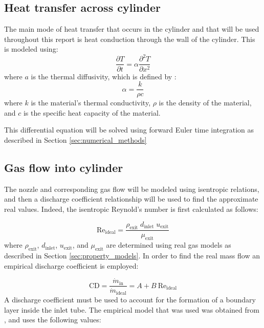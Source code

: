 





\subsection{Heat transfer across cylinder}

The main mode of heat transfer that occurs in the cylinder and that will be used throughout this report is heat conduction through the wall of the cylinder. This is modeled using:
\begin{equation}
\frac{\partial T}{\partial t} = \alpha \frac{\partial^2 T }{\partial x^2}
\end{equation}
where $a$ is the thermal diffusivity, which is defined by :
\begin{equation}
\alpha = \frac{k}{\rho c}
\end{equation}
where $k$ is the material's thermal conductivity, $\rho$ is the density of the material, and $c$ is the specific heat capacity of the material.

This differential equation will be solved using forward Euler time integration as described in Section \ref{sec:numerical_methods}

\subsection{Gas flow into cylinder}

The nozzle and corresponding gas flow will be modeled using isentropic relations, and then a discharge coefficient relationship will be used to find the approximate real values. Indeed, the isentropic Reynold's number is first calculated as follows:

\begin{equation}
\text{Re}_{\text{ideal}} = \frac{\rho_{\text{exit}}\;d_{\text{inlet}}\;u_{\text{exit}}}{\mu_{\text{exit}}}
\end{equation}
where $\rho_{\text{exit}}$, $d_{\text{inlet}}$, $u_{\text{exit}}$, and $\mu_{\text{exit}}$ are determined using real gas models as described in Section \ref{sec:property_models}. In order to find the real mass flow an empirical discharge coefficient is employed:

\begin{equation}
\text{CD} = \frac{\dot{m}_{\text{in}}}{\dot{m}_{\text{ideal}}} = A + B \:\text{Re}_{\text{ideal}} 
\end{equation}
A discharge coefficient must be used to account for the formation of a boundary layer inside the inlet tube. The empirical model that was used was obtained from , and uses the following values:

